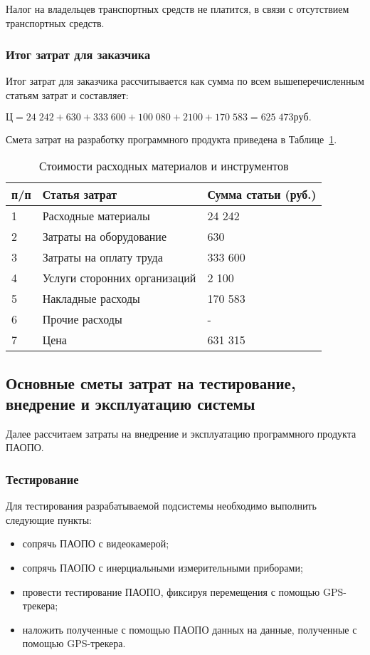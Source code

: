Налог на владельцев транспортных средств не платится, в связи с отсутствием транспортных средств. 

\subsubsection{Итог затрат для заказчика}

Итог затрат для заказчика рассчитывается как сумма по всем вышеперечисленным статьям затрат и составляет:

$Ц = 24 \; 242+ 630 + 333 \; 600  + 100 \; 080  + 2100 + 170 \; 583   =  625 \; 473  руб.$

Смета затрат на разработку программного продукта приведена в Таблице~\ref{tab:c}.

\begin{table}[!htb]
	\caption{Стоимости расходных материалов и инструментов}\label{tab:c}
    \centering
        \begin{tabular}{|l|l|l|}
        		\hline
        		\textnumero п/п & Статья затрат & Сумма статьи (руб.) \\
        		\hline
        		1 & Расходные материалы & 24 242 \\
        		\hline
        		2  & Затраты на оборудование & 630 \\
        		\hline
        		3  & Затраты на оплату труда & 333 600 \\
        		\hline
        		4  & Услуги сторонних организаций & 2 100 \\
        		\hline
        		5  &  Накладные расходы & 170 583 \\
        		\hline
        		6 & Прочие расходы & - \\
        		\hline
        		7 & Цена & 631 315 \\
        		\hline
        \end{tabular}   		
\end{table}


\subsection{Основные сметы затрат на тестирование, внедрение и эксплуатацию системы}

Далее рассчитаем затраты на внедрение и эксплуатацию программного продукта ПАОПО.

\subsubsection{Тестирование}
Для тестирования разрабатываемой подсистемы необходимо выполнить следующие пункты:
\begin{itemize}
\item сопрячь ПАОПО с видеокамерой;
\item сопрячь ПАОПО с инерциальными измерительными приборами;
\item провести тестирование ПАОПО, фиксируя перемещения с помощью GPS-трекера;
\item наложить полученные с помощью ПАОПО данных на данные, полученные с помощью GPS-трекера.
\end{itemize}

